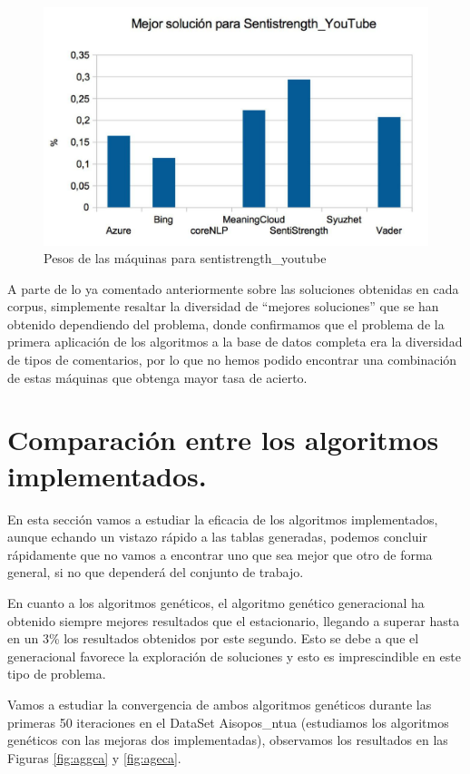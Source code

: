 \documentclass{article}
\begin{document}
\begin{figure} [H]
	\centering
	\includegraphics[width=0.7\linewidth]{youtube}
	\caption{Pesos de las máquinas para sentistrength\_youtube}
	\label{fig:youtube}
\end{figure}

A parte de lo ya comentado anteriormente sobre las soluciones obtenidas en cada corpus, simplemente resaltar la diversidad de ``mejores soluciones'' que se han obtenido dependiendo del problema, donde confirmamos que el problema de la primera aplicación de los algoritmos a la base de datos completa era la diversidad de tipos de comentarios, por lo que no hemos podido encontrar una combinación de estas máquinas que obtenga mayor tasa de acierto.

\section{Comparación entre los algoritmos implementados.}

	En esta sección vamos a estudiar la eficacia de los algoritmos implementados, aunque echando un vistazo rápido a las tablas generadas, podemos concluir rápidamente que no vamos a encontrar uno que sea mejor que otro de forma general, si no que dependerá del conjunto de trabajo. 
	
	En cuanto a los algoritmos genéticos, el algoritmo genético generacional ha obtenido siempre mejores resultados que el estacionario, llegando a superar hasta en un 3\% los resultados obtenidos por este segundo. Esto se debe a que el generacional favorece la exploración de soluciones y esto es imprescindible en este tipo de problema. 
	
	Vamos a estudiar la convergencia de ambos algoritmos genéticos durante las primeras 50 iteraciones en el DataSet Aisopos\_ntua (estudiamos los algoritmos genéticos con las mejoras dos implementadas), observamos los resultados en las Figuras \ref{fig:aggca} y \ref{fig:ageca}.
	
\end{document}
